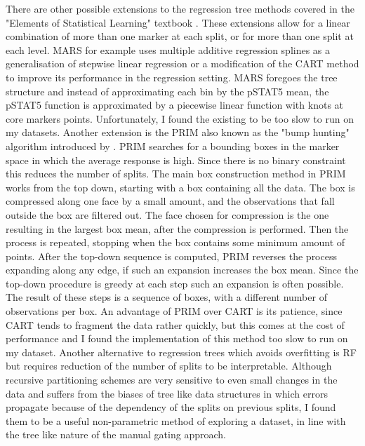 There are other possible extensions to the regression tree methods covered in the "Elements of Statistical Learning" textbook \citep{Anonymous:ikywRZeA}.
These extensions allow for a linear combination of more than one marker at each split, or for more than one split at each level.
\Gls{MARS} for example uses multiple additive regression splines as a generalisation of stepwise linear regression or a modification of the CART method to improve its performance in the regression setting.
\Gls{MARS} foregoes the tree structure and instead of approximating each bin by the pSTAT5 mean, the pSTAT5 function is approximated by a piecewise linear function with knots at core markers points.
Unfortunately, I found the existing  to be too slow to run on my datasets.
Another extension is the \gls{PRIM} also known as the "bump hunting" algorithm introduced by \citet{Friedman:1999iy}.
\gls{PRIM} searches for a bounding boxes in the marker space in which the average response is high.
Since there is no binary constraint this reduces the number of splits.
The main box construction method in PRIM works from the top down, starting with a box containing all the data.
The box is compressed along one face by a small amount, and the observations that fall outside the box are filtered out.
The face chosen for compression is the one resulting in the largest box mean, after the compression is performed.
Then the process is repeated, stopping when the box contains some minimum amount of points.
After the top-down sequence is computed, PRIM reverses the process expanding along any edge, if such an expansion increases the box mean.
Since the top-down procedure is greedy at each step such an expansion is often possible.
The result of these steps is a sequence of boxes, with a different number of observations per box.
An advantage of PRIM over CART is its patience, since CART tends to fragment the data rather quickly, but this comes at the cost of performance and I found the  implementation of this method too slow to run on my dataset.
%
Another alternative to regression trees which avoids overfitting is \gls{RF} but requires reduction of the number of splits to be interpretable.
Although recursive partitioning schemes are very sensitive to even small changes in the data and suffers from the biases of tree like data structures in which errors propagate because of the dependency of the splits on previous splits, I found them to be a useful non-parametric method of exploring a dataset, in line with the tree like nature of the manual gating approach.

